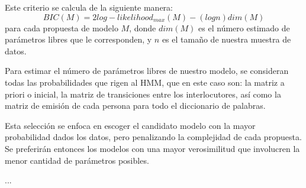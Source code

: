 Este criterio se calcula de la siguiente manera: 
\begin{equation}
BIC(M) = 2 log-likelihood_{max}(M) - (log n ) dim(M)
\end{equation}
para cada propuesta de modelo $M$, donde $dim(M)$ es el número estimado de parámetros libres que le corresponden, y $n$ es el tamaño de nuestra muestra de datos.

Para estimar el número de parámetros libres de nuestro modelo, se consideran todas las probabilidades que rigen al \ac{HMM}, que en este caso son: la matriz a priori o inicial, la matriz de transiciones entre los interlocutores, así como la matriz de emisión de cada persona para todo el diccionario de palabras.

Esta selección se enfoca en escoger el candidato modelo con la mayor probabilidad dados los datos, pero penalizando la complejidad de cada propuesta. Se preferirán entonces los modelos con una mayor verosimilitud que involucren la menor cantidad de parámetros posibles. 

...